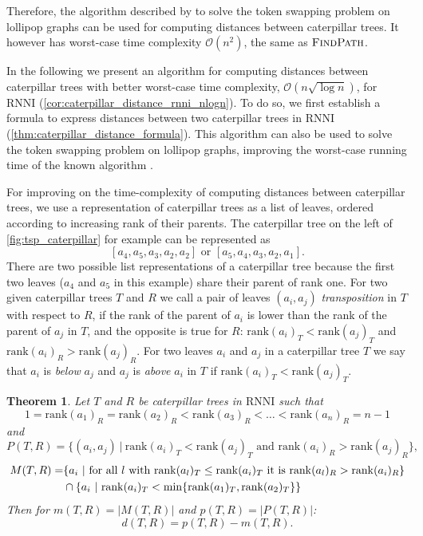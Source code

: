 \documentclass[11pt]{amsart}
\newtheorem{theorem}{Theorem}
\newcommand{\rnni}{\mathrm{RNNI}}
\newcommand{\findpath}{\textsc{FindPath}}
\newcommand{\rank}{\mathrm{rank}}
\renewcommand{\O}{\mathcal O}
\begin{document}
Therefore, the algorithm described by \textcite{Kawahara2017-ey} to solve the token swapping problem on lollipop graphs can be used for computing distances between caterpillar trees.
It however has worst-case time complexity $\O(n^2)$, the same as $\findpath$.

In the following we present an algorithm for computing distances between caterpillar trees with better worst-case time complexity, $\O(n \sqrt{\log n})$, for $\rnni$ (\autoref{cor:caterpillar_distance_rnni_nlogn}).
To do so, we first establish a formula to express distances between two caterpillar trees in $\rnni$ (\autoref{thm:caterpillar_distance_formula}).
This algorithm can also be used to solve the token swapping problem on lollipop graphs, improving the worst-case running time of the known algorithm \autocite{Kawahara2017-ey}.

For improving on the time-complexity of computing distances between caterpillar trees, we use a representation of caterpillar trees as a list of leaves, ordered according to increasing rank of their parents.
The caterpillar tree on the left of \autoref{fig:tsp_caterpillar} for example can be represented as 
\[[a_4,a_5,a_3,a_2,a_2] \text{ or }[a_5,a_4,a_3,a_2,a_1].\]
There are two possible list representations of a caterpillar tree because the first two leaves ($a_4$ and $a_5$ in this example) share their parent of rank one.
For two given caterpillar trees $T$ and $R$ we call a pair of leaves $(a_i,a_j)$ \emph{transposition} in $T$ with respect to $R$, if the rank of the parent of $a_i$ is lower than the rank of the parent of $a_j$ in $T$, and the opposite is true for $R$: $\rank(a_i)_T < \rank(a_j)_T$ and $\rank(a_i)_R > \rank(a_j)_R$.
For two leaves $a_i$ and $a_j$ in a caterpillar tree $T$ we say that $a_i$ is \emph{below} $a_j$ and $a_j$ is \emph{above} $a_i$ in $T$ if $\rank(a_i)_T < \rank(a_j)_T$.

\begin{theorem}
	\label{thm:caterpillar_distance_formula}
	Let $T$ and $R$ be caterpillar trees in $\rnni$ such that \[1 = \rank(a_1)_R = \rank(a_2)_R < \rank(a_3)_R < \ldots < \rank(a_n)_R = n-1\]
	and
	\[P(T,R) = \{(a_i,a_j)\ |\  \rank(a_i)_T < \rank(a_j)_T \text{ and } \rank(a_i)_R > \rank(a_j)_R\},\]
	\begin{align*}
		M(T,R) = &\{a_i\ |\  \textnormal{for all } l \textnormal{ with } \rank(a_l)_T \leq \rank(a_i)_T \textnormal{ it is } \rank(a_l)_R > \rank(a_i)_R\} \\
		& \cap \{a_i \ |\  \rank(a_i)_T < \min\{\rank(a_1)_T, \rank(a_2)_T\}\}
	\end{align*}
	Then for ${m(T,R) = |M(T,R)|}$ and ${p(T,R) = |P(T,R)|}$:
	\[d(T,R) = p(T,R) - m(T,R).\]
\end{theorem}
\end{document}
